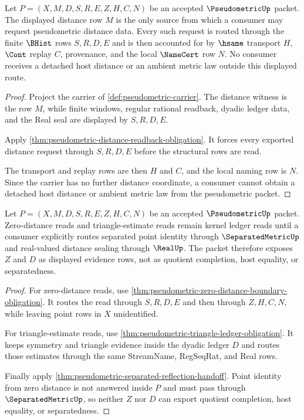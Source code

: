 \begin{theorem}
\label{thm:pseudometric-distance-source}
Let $P=(X,M,D,S,R,E,Z,H,C,N)$ be an accepted $\PseudometricUp$ packet. The displayed distance row $M$ is the only source from which a consumer may request pseudometric distance data. Every such request is routed through the finite $\BHist$ rows $S,R,D,E$ and is then accounted for by $\hsame$ transport $H$, $\Cont$ replay $C$, provenance, and the local $\NameCert$ row $N$. No consumer receives a detached host distance or an ambient metric law outside this displayed route.
\end{theorem}
\begin{proof}
Project the carrier of \autoref{def:pseudometric-carrier}. The distance witness is the row $M$, while finite windows, regular rational readback, dyadic ledger data, and the Real seal are displayed by $S,R,D,E$.

Apply \autoref{thm:pseudometric-distance-readback-obligation}. It forces every exported distance request through $S,R,D,E$ before the structural rows are read.

The transport and replay rows are then $H$ and $C$, and the local naming row is $N$. Since the carrier has no further distance coordinate, a consumer cannot obtain a detached host distance or ambient metric law from the pseudometric packet.
\end{proof}

\begin{theorem}
\label{thm:pseudometric-kernel-route}
Let $P=(X,M,D,S,R,E,Z,H,C,N)$ be an accepted $\PseudometricUp$ packet. Zero-distance reads and triangle-estimate reads remain kernel ledger reads until a consumer explicitly routes separated point identity through $\SeparatedMetricUp$ and real-valued distance sealing through $\RealUp$. The packet therefore exposes $Z$ and $D$ as displayed evidence rows, not as quotient completion, host equality, or separatedness.
\end{theorem}
\begin{proof}
For zero-distance reads, use \autoref{thm:pseudometric-zero-distance-boundary-obligation}. It routes the read through $S,R,D,E$ and then through $Z,H,C,N$, while leaving point rows in $X$ unidentified.

For triangle-estimate reads, use \autoref{thm:pseudometric-triangle-ledger-obligation}. It keeps symmetry and triangle evidence inside the dyadic ledger $D$ and routes those estimates through the same StreamName, RegSeqRat, and Real rows.

Finally apply \autoref{thm:pseudometric-separated-reflection-handoff}. Point identity from zero distance is not answered inside $P$ and must pass through $\SeparatedMetricUp$, so neither $Z$ nor $D$ can export quotient completion, host equality, or separatedness.
\end{proof}

